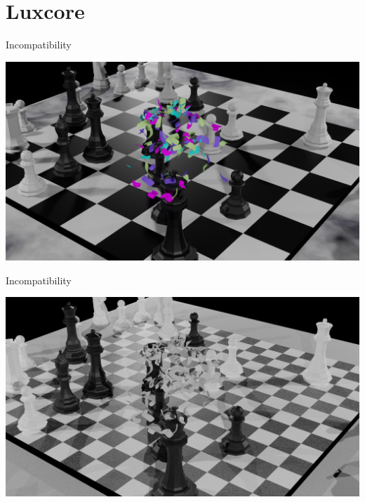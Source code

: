 \documentclass[presentation, 8pt]{beamer}
\begin{document}
\section{Luxcore}
\label{sec:org466f244}
\begin{frame}[label={sec:org4099751}]{Incompatibility}
\begin{center}
\includegraphics[width=.9\linewidth]{Images/luxcore fail-eevee.png}
\end{center}
\end{frame}
\begin{frame}[label={sec:orgb1247dc}]{Incompatibility}
\begin{center}
\includegraphics[width=.9\linewidth]{Images/luxcore fail.png}
\end{center}
\end{frame}
\end{document}
